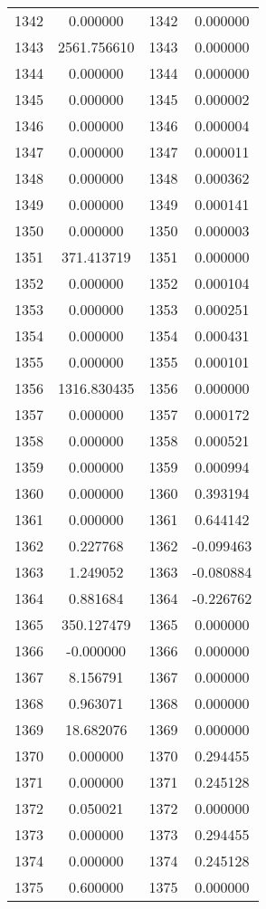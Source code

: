 \documentclass[12pt]{article}
\begin{document}
\begin{longtable}{@{}cccc@{}}
1342 & 0.000000 & 1342 & 0.000000 \\
1343 & 2561.756610 & 1343 & 0.000000 \\
1344 & 0.000000 & 1344 & 0.000000 \\
1345 & 0.000000 & 1345 & 0.000002 \\
1346 & 0.000000 & 1346 & 0.000004 \\
1347 & 0.000000 & 1347 & 0.000011 \\
1348 & 0.000000 & 1348 & 0.000362 \\
1349 & 0.000000 & 1349 & 0.000141 \\
1350 & 0.000000 & 1350 & 0.000003 \\
1351 & 371.413719 & 1351 & 0.000000 \\
1352 & 0.000000 & 1352 & 0.000104 \\
1353 & 0.000000 & 1353 & 0.000251 \\
1354 & 0.000000 & 1354 & 0.000431 \\
1355 & 0.000000 & 1355 & 0.000101 \\
1356 & 1316.830435 & 1356 & 0.000000 \\
1357 & 0.000000 & 1357 & 0.000172 \\
1358 & 0.000000 & 1358 & 0.000521 \\
1359 & 0.000000 & 1359 & 0.000994 \\
1360 & 0.000000 & 1360 & 0.393194 \\
1361 & 0.000000 & 1361 & 0.644142 \\
1362 & 0.227768 & 1362 & -0.099463 \\
1363 & 1.249052 & 1363 & -0.080884 \\
1364 & 0.881684 & 1364 & -0.226762 \\
1365 & 350.127479 & 1365 & 0.000000 \\
1366 & -0.000000 & 1366 & 0.000000 \\
1367 & 8.156791 & 1367 & 0.000000 \\
1368 & 0.963071 & 1368 & 0.000000 \\
1369 & 18.682076 & 1369 & 0.000000 \\
1370 & 0.000000 & 1370 & 0.294455 \\
1371 & 0.000000 & 1371 & 0.245128 \\
1372 & 0.050021 & 1372 & 0.000000 \\
1373 & 0.000000 & 1373 & 0.294455 \\
1374 & 0.000000 & 1374 & 0.245128 \\
1375 & 0.600000 & 1375 & 0.000000 \\

\end{longtable}
\end{document}

